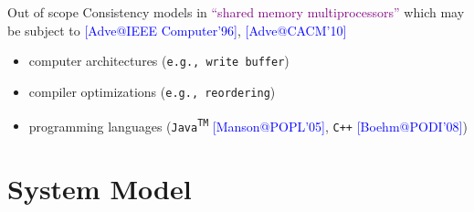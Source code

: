 \documentclass{beamer}
\makeatletter
\newcommand{\citeinbeamer}[3]{{\scriptsize{\textcolor{blue}{[#1@#2'#3]}}}}
\newcommand{\largepurple}[1]{\textcolor{purple}{\large #1}}
\newcommand{\boxedpoint}[1]{
  \begin{center}
    \fbox{\textcolor{red}{\bf #1}}
  \end{center}
}
\makeatother
\begin{document}
\begin{frame}{Out of scope}
  Consistency models in \largepurple{``shared memory multiprocessors''} which
  may be subject to \citeinbeamer{Adve}{IEEE Computer}{96},
  \citeinbeamer{Adve}{CACM}{10}

  \begin{itemize}
	\item computer architectures (\texttt{e.g., write buffer})
    \item compiler optimizations (\texttt{e.g., reordering})
    \item programming languages (\texttt{Java\textsuperscript{TM}}
    \citeinbeamer{Manson}{POPL}{05}, \texttt{C++}
    \citeinbeamer{Boehm}{PODI}{08})
  \end{itemize}

  \vspace{0.30cm}

  \boxedpoint{The principles are similar, but the details differ a lot !}
\end{frame}
\section{System Model}
\end{document}

